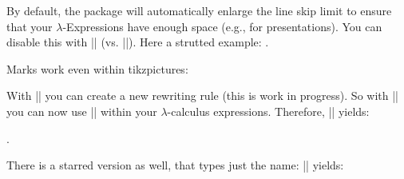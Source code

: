 \documentclass[parskip=half,english,numbers=noenddot,footnotes=nomultiple,oneside]{scrartcl}
\begin{document}
   By default, the package will automatically enlarge the line skip limit to ensure that your \(\lambda\)-Expressions have enough space (e.g., for presentations). You can disable this with |\lcDoNotStrutLine| (vs. |\lcDoStrutLine|). Here a strutted example: {\lcDoStrutLine{}}.


   Marks work even within tikzpictures:
   \begin{center}
   \end{center}

   With |\lcCreateNewRewritingRule| you can create a new rewriting rule (this is work in progress).
   So with |\lcCreateNewRewritingRule{}| you can now use |\cons| within your \(\lambda\)-calculus expressions. Therefore, \lcCreateNewRewritingRule{}|| yields:

   .

   There is a starred version as well, that types just the name: || yields: 
\end{document}
